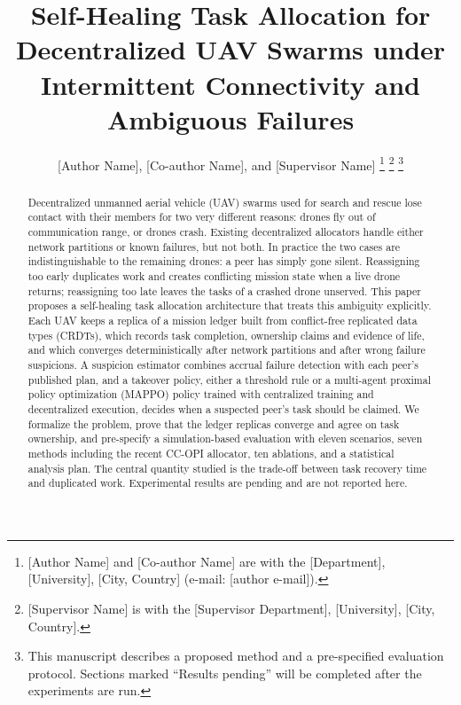 \documentclass[journal]{IEEEtran}
\begin{document}
\title{Self-Healing Task Allocation for Decentralized UAV Swarms under Intermittent Connectivity and Ambiguous Failures}

\author{[Author Name], [Co-author Name], and [Supervisor Name]%
\thanks{[Author Name] and [Co-author Name] are with the [Department], [University], [City, Country] (e-mail: [author e-mail]).}%
\thanks{[Supervisor Name] is with the [Supervisor Department], [University], [City, Country].}%
\thanks{This manuscript describes a proposed method and a pre-specified evaluation protocol. Sections marked ``Results pending'' will be completed after the experiments are run.}}


\maketitle

\begin{abstract}
Decentralized unmanned aerial vehicle (UAV) swarms used for search and rescue lose contact with their members for two very different reasons: drones fly out of communication range, or drones crash. Existing decentralized allocators handle either network partitions or known failures, but not both. In practice the two cases are indistinguishable to the remaining drones: a peer has simply gone silent. Reassigning too early duplicates work and creates conflicting mission state when a live drone returns; reassigning too late leaves the tasks of a crashed drone unserved. This paper proposes a self-healing task allocation architecture that treats this ambiguity explicitly. Each UAV keeps a replica of a mission ledger built from conflict-free replicated data types (CRDTs), which records task completion, ownership claims and evidence of life, and which converges deterministically after network partitions and after wrong failure suspicions. A suspicion estimator combines accrual failure detection with each peer's published plan, and a takeover policy, either a threshold rule or a multi-agent proximal policy optimization (MAPPO) policy trained with centralized training and decentralized execution, decides when a suspected peer's task should be claimed. We formalize the problem, prove that the ledger replicas converge and agree on task ownership, and pre-specify a simulation-based evaluation with eleven scenarios, seven methods including the recent CC-OPI allocator, ten ablations, and a statistical analysis plan. The central quantity studied is the trade-off between task recovery time and duplicated work. Experimental results are pending and are not reported here.
\end{abstract}
\end{document}
